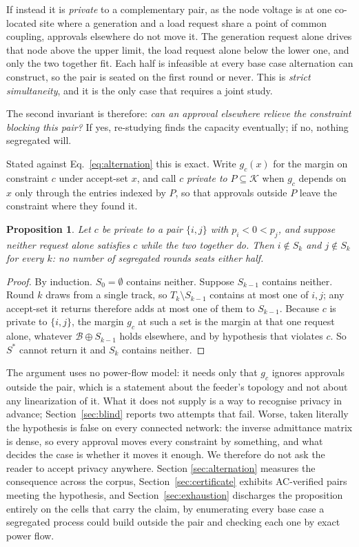 \documentclass[review,authoryear,12pt]{elsarticle}
\newtheorem{proposition}{Proposition}
\begin{document}
If instead it is \emph{private} to a complementary pair, as the node voltage is
at one co-located site where a generation and a load request share a point of
common coupling, approvals elsewhere do not move it. The generation request
alone drives that node above the upper limit, the load request alone below the
lower one, and only the two together fit. Each half is infeasible at every base
case alternation can construct, so the pair is seated on the first round or
never. This is \emph{strict simultaneity}, and it is the only case that
requires a joint study.

The second invariant is therefore: \emph{can an approval elsewhere relieve the
constraint blocking this pair?} If yes, re-studying finds the capacity
eventually; if no, nothing segregated will.

Stated against Eq.~\eqref{eq:alternation} this is exact. Write
$g_c(x)$ for the margin on constraint $c$ under accept-set $x$, and call $c$
\emph{private to} $P \subseteq \mathcal{K}$ when $g_c$ depends on $x$ only
through the entries indexed by $P$, so that approvals outside $P$ leave the
constraint where they found it.

\begin{proposition}
\label{prop:private}
Let $c$ be private to a pair $\{i,j\}$ with $p_i < 0 < p_j$, and suppose
neither request alone satisfies $c$ while the two together do. Then $i \notin
S_k$ and $j \notin S_k$ for every $k$: no number of segregated rounds seats
either half.
\end{proposition}

\begin{proof}
By induction. $S_0 = \emptyset$ contains neither. Suppose $S_{k-1}$ contains
neither. Round $k$ draws from a single track, so $T_k \setminus S_{k-1}$
contains at most one of $i,j$; any accept-set it returns therefore adds at
most one of them to $S_{k-1}$. Because $c$ is private to $\{i,j\}$, the margin
$g_c$ at such a set is the margin at that one request alone, whatever
$\mathcal{B} \oplus S_{k-1}$ holds elsewhere, and by hypothesis that violates
$c$. So $S^{\ast}$ cannot return it and $S_k$ contains neither.
\end{proof}

The argument uses no power-flow model: it needs only that $g_c$ ignores
approvals outside the pair, which is a statement about the feeder's topology
and not about any linearization of it. What it does not supply is a way to
recognise privacy in advance; Section~\ref{sec:blind} reports two attempts
that fail. Worse, taken literally the hypothesis is false on every connected
network: the inverse admittance matrix is dense, so every approval moves every
constraint by something, and what decides the case is whether it moves it
enough. We therefore do not ask the reader to accept privacy anywhere. Section
\ref{sec:alternation} measures the consequence across the corpus,
Section~\ref{sec:certificate} exhibits AC-verified pairs meeting the
hypothesis, and Section~\ref{sec:exhaustion} discharges the proposition
entirely on the cells that carry the claim, by enumerating every base case a
segregated process could build outside the pair and checking each one by exact
power flow.
\end{document}

